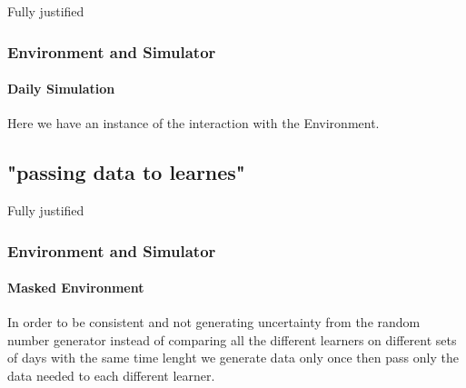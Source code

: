 \documentclass{beamer}
\begin{document}
\begin {frame} {Fully justified}

\frametitle{Environment and Simulator}
\framesubtitle{Daily Simulation}

Here we have an instance of the interaction with the Environment.



\end {frame}




\subsection{"passing data to learnes"} %

\begin {frame}{Fully justified}

\frametitle{Environment and Simulator}
\framesubtitle{Masked Environment}

In order to be consistent and not generating uncertainty from the random number generator instead of 
comparing all the different learners on different sets of days with the same time lenght we generate 
data only once then pass only the data needed to each different learner.


\end{frame}

\end{document}
